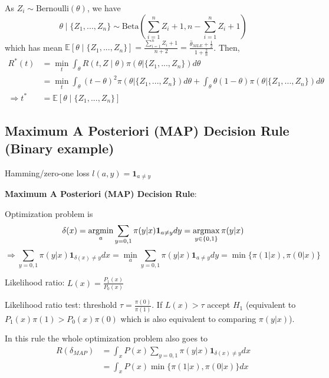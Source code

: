 \documentclass[11pt]{elegantbook}
\newcommand{\argmax}{\operatornamewithlimits{argmax}}
\newcommand{\argmin}{\operatornamewithlimits{argmin}}
\begin{document}
\begin{example}
\begin{equation}
        \nonumber
    \end{equation}
    As $Z_i\sim \text{Bernoulli}(\theta)$, we have $$\theta\mid \{Z_1,...,Z_n\}\sim \text{Beta}\left(\sum_{i=1}^n Z_i+1, n- \sum_{i=1}^n Z_i+1\right)$$
    which has mean $\mathbb{E}[\theta\mid \{Z_1,...,Z_n\}]=\frac{\sum_{i=1}^n Z_i+1}{n+2}=\frac{\hat{\theta}_{MLE}+\frac{1}{2}}{1+\frac{2}{n}}$.
    Then,
    \begin{equation}
        \begin{aligned}
            R^*(t)&=\min_t\int_\theta R(t,Z\mid \theta) \pi(\theta| \{Z_1,...,Z_n\}) d\theta\\
            &=\min_t \int_\theta (t-\theta)^2 \pi(\theta| \{Z_1,...,Z_n\}) d\theta+\int_\theta \theta(1-\theta)\pi(\theta| \{Z_1,...,Z_n\}) d\theta\\
            \Rightarrow t^*&=\mathbb{E}[\theta\mid \{Z_1,...,Z_n\}]
        \end{aligned}
        \nonumber
    \end{equation}
\end{example}


\subsection{Maximum A Posteriori (MAP) Decision Rule (Binary example)}
\begin{example}
    Hamming/zero-one loss $l(a,y)=\mathbf{1}_{a\neq y}$
\end{example}

\textbf{Maximum A Posteriori (MAP) Decision Rule}:

Optimization problem is $$\delta(x)=\argmin_{a} \sum_{y=0,1} \pi(y|x) \mathbf{1}_{a\neq y} dy=\argmax_{y\in\{0,1\}}\pi(y|x)$$
$$\Rightarrow \sum_{y=0,1} \pi(y|x) \mathbf{1}_{\delta(x)\neq y} dx=\min_{a} \sum_{y=0,1} \pi(y|x) \mathbf{1}_{a\neq y} dy=\min\{\pi(1|x),\pi(0|x)\}$$

Likelihood ratio: $L(x)=\frac{P_1(x)}{P_0(x)}$

Likelihood ratio test: threshold $\tau=\frac{\pi(0)}{\pi(1)}$. If $L(x)>\tau$ accept $H_1$ (equivalent to $P_1(x)\pi(1)>P_0(x)\pi(0)$ which is also equivalent to comparing $\pi(y|x)$).

In this rule the whole optimization problem also goes to
\begin{equation}
    \begin{aligned}
        R(\delta_{MAP})&=\int_x P(x)\sum_{y=0,1} \pi(y|x) \mathbf{1}_{\delta(x)\neq y} dx\\
        &=\int_x P(x)\min\{\pi(1|x),\pi(0|x)\}dx
    \end{aligned}
    \nonumber
\end{equation}
\end{document}
